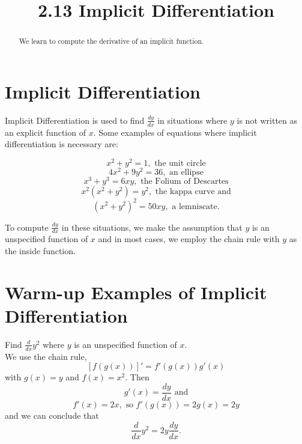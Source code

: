 \documentclass{ximera}
\title{2.13 Implicit Differentiation}
\begin{document}
\begin{abstract}
We learn to compute the derivative of an implicit function.
\end{abstract}

\maketitle

\section{Implicit Differentiation}

Implicit Differentiation is used to find $\frac{dy}{dx}$ in situations where $y$ is not written 
as an explicit function of $x$. 
Some examples of equations where implicit differentiation is necessary are:

\[x^2 + y^2 = 1, \text{ the unit circle} \]
\[4x^2 + 9y^2 = 36, \text{ an ellipse} \]
\[x^3 + y^3 =6xy, \text{ the Folium of Descartes}\]
\[x^2(x^2 + y^2) =y^2,  \text{ the kappa curve and}\]
\[(x^2 + y^2)^2 =50xy, \text{ a lemniscate}.\]

To compute $\frac{dy}{dx}$ in these situations, we make the assumption that $y$ is an unspecified 
function of $x$ and in most cases,
we employ the chain rule  with $y$ as the inside function.

\section{Warm-up Examples of Implicit Differentiation}

\begin{example}[example 1]
Find $\frac{d}{dx} y^2$ where $y$ is an unspecified function of $x$.\\
We use the chain rule,
\[\displaystyle{[f(g(x))]' = f'(g(x))g'(x)}\]
with $g(x) = y$ and $f(x) = x^2$. Then 
\[g'(x) = \frac{dy}{dx} \text{ and}\]
\[f'(x) = 2x, \text{ so } f'(g(x)) = 2g(x) = 2y\]
and we can conclude that
\[\frac{d}{dx} y^2 = 2y \frac{dy}{dx}.\]
\end{example}


\begin{center}
\begin{foldable}
\end{foldable}
\end{center}
\end{document}
